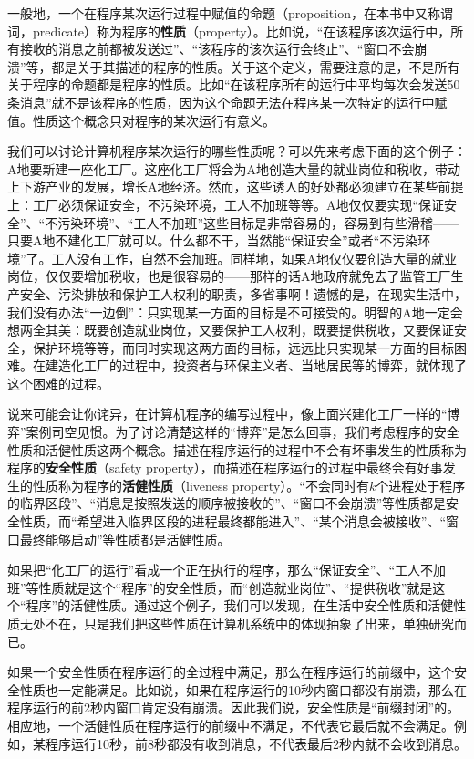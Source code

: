 \documentclass[UTF8,AutoFakeBold=1,AutoFakeSlant,zihao=-4]{cucthesis}
\begin{document}
一般地，一个在程序某次运行过程中赋值的命题（proposition，在本书中又称谓词，predicate）称为程序的\textbf{性质}（property）。比如说，“在该程序该次运行中，所有接收的消息之前都被发送过”、“该程序的该次运行会终止”、“窗口不会崩溃”等，都是关于其描述的程序的性质。关于这个定义，需要注意的是，不是所有关于程序的命题都是程序的性质。比如“在该程序所有的运行中平均每次会发送50条消息”就不是该程序的性质，因为这个命题无法在程序某一次特定的运行中赋值。性质这个概念只对程序的某次运行有意义。

我们可以讨论计算机程序某次运行的哪些性质呢？可以先来考虑下面的这个例子：A地要新建一座化工厂。这座化工厂将会为A地创造大量的就业岗位和税收，带动上下游产业的发展，增长A地经济。然而，这些诱人的好处都必须建立在某些前提上：工厂必须保证安全，不污染环境，工人不加班等等。A地仅仅要实现“保证安全”、“不污染环境”、“工人不加班”这些目标是非常容易的，容易到有些滑稽——只要A地不建化工厂就可以。什么都不干，当然能“保证安全”或者“不污染环境”了。工人没有工作，自然不会加班。同样地，如果A地仅仅要创造大量的就业岗位，仅仅要增加税收，也是很容易的——那样的话A地政府就免去了监管工厂生产安全、污染排放和保护工人权利的职责，多省事啊！遗憾的是，在现实生活中，我们没有办法“一边倒”：只实现某一方面的目标是不可接受的。明智的A地一定会想两全其美：既要创造就业岗位，又要保护工人权利，既要提供税收，又要保证安全，保护环境等等，而同时实现这两方面的目标，远远比只实现某一方面的目标困难。在建造化工厂的过程中，投资者与环保主义者、当地居民等的博弈，就体现了这个困难的过程。

说来可能会让你诧异，在计算机程序的编写过程中，像上面兴建化工厂一样的“博弈”案例司空见惯。为了讨论清楚这样的“博弈”是怎么回事，我们考虑程序的安全性质和活健性质这两个概念。描述在程序运行的过程中不会有坏事发生的性质称为程序的\textbf{安全性质}（safety property），而描述在程序运行的过程中最终会有好事发生的性质称为程序的\textbf{活健性质}（liveness property）。“不会同时有$k$个进程处于程序的临界区段”、“消息是按照发送的顺序被接收的”、“窗口不会崩溃”等性质都是安全性质，而“希望进入临界区段的进程最终都能进入”、“某个消息会被接收”、“窗口最终能够启动”等性质都是活健性质。

如果把“化工厂的运行”看成一个正在执行的程序，那么“保证安全”、“工人不加班”等性质就是这个“程序”的安全性质，而“创造就业岗位”、“提供税收”就是这个“程序”的活健性质。通过这个例子，我们可以发现，在生活中安全性质和活健性质无处不在，只是我们把这些性质在计算机系统中的体现抽象了出来，单独研究而已。

如果一个安全性质在程序运行的全过程中满足，那么在程序运行的前缀中，这个安全性质也一定能满足。比如说，如果在程序运行的10秒内窗口都没有崩溃，那么在程序运行的前2秒内窗口肯定没有崩溃。因此我们说，安全性质是“前缀封闭”的。相应地，一个活健性质在程序运行的前缀中不满足，不代表它最后就不会满足。例如，某程序运行10秒，前8秒都没有收到消息，不代表最后2秒内就不会收到消息。
\end{document}
